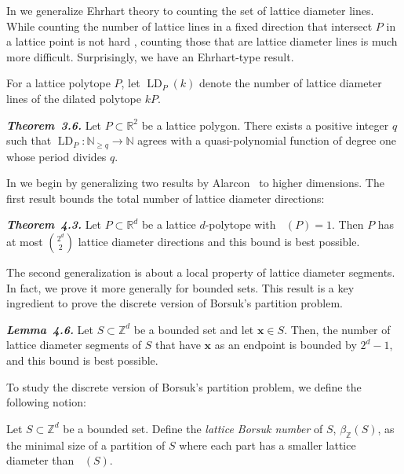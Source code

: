 \documentclass[11pt]{article}
\newcommand{\bx}{\mathbf{x}}
\newcommand{\R}{\mathbb{R}}
\newcommand{\Z}{\mathbb{Z}}
\newcommand{\N}{\mathbb{N}}
\DeclareMathOperator{\ldiam}{diam_\Z}
\DeclareMathOperator{\LD}{LD}
\begin{document}
In  we generalize Ehrhart theory to counting the set of lattice diameter lines. While counting the number of lattice lines in a fixed direction that intersect $P$ in a lattice point is not hard \cite{aebThesis}, counting those that are lattice diameter lines is much more difficult. Surprisingly, we have an Ehrhart-type result.

\begin{definition}\label{def:LD_P}
    For a lattice polytope $P$, let $\LD_P(k)$ denote the number of lattice diameter lines of the dilated polytope $kP$.
\end{definition}

\begin{manualthm}
    \emph{\textbf{Theorem~3.6.}} Let $P \subset \R^2$ be a lattice polygon. There exists a positive integer $q$ such that \mbox{$\LD_P: \N_{\geq q} \to \N$} agrees with a quasi-polynomial function of degree one whose period divides $q$.
\end{manualthm}

 In  we begin by generalizing two results by Alarcon~\cite{Alarcon_PhD} to higher dimensions. The first result bounds the total number of lattice diameter directions:

\begin{manualthm}\textbf{\emph{Theorem~4.3.}}
    Let $P\subset \R^d$ be a lattice $d$-polytope with $\ldiam(P)=1$. Then $P$ has at most $\binom{2^d}{2}$ lattice diameter directions and this bound is best possible.
\end{manualthm}

The second generalization is about a local property of lattice diameter segments. In fact, we prove it more generally for bounded sets. This result is a key ingredient to prove the discrete version of Borsuk's partition problem.

\begin{manualthm}\textbf{\emph{Lemma~4.6.}}
    Let $S\subset \Z^d$ be a bounded set and let $\bx \in S$. Then, the number of lattice diameter segments of $S$ that have $\bx$ as an endpoint is bounded by $2^d-1$, and this bound is best possible.
\end{manualthm}

To study the discrete version of Borsuk's partition problem, we define the following notion:

\begin{definition}
    Let $S \subset \Z^d$ be a bounded set. Define the \textit{lattice Borsuk number} of $S$, $\beta_\Z(S)$, as the minimal size of a partition of $S$ where each part has a smaller lattice diameter than $\ldiam(S)$.
\end{definition}
\end{document}

